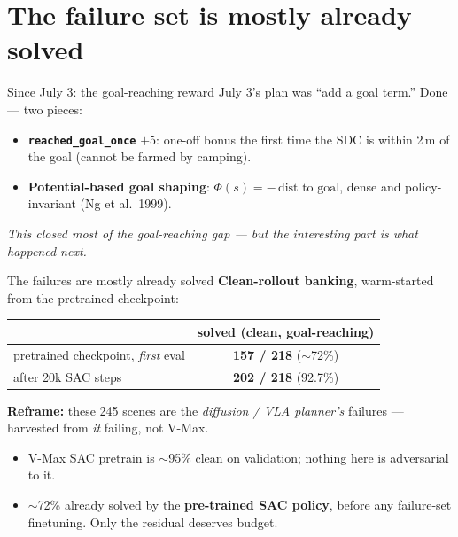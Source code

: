 
\section{The failure set is mostly already solved}

\begin{frame}{Since July 3: the goal-reaching reward}
  July 3's plan was ``add a goal term.'' Done --- two pieces:
  \begin{itemize}
    \item \textbf{\texttt{reached\_goal\_once}} $+5$: one-off bonus the first time the SDC is within 2\,m of the goal (cannot be farmed by camping).
    \item \textbf{Potential-based goal shaping}: $\Phi(s) = -\,\text{dist to goal}$, dense and policy-invariant (Ng et al.\ 1999).
  \end{itemize}

  \vspace{0.6em}
  \centering
  \textit{This closed most of the goal-reaching gap --- but the interesting part is what happened next.}
\end{frame}

\begin{frame}{The failures are mostly already solved}
  \textbf{Clean-rollout banking}, warm-started from the pretrained checkpoint:
  \begin{center}
    \begin{tabular}{@{}lc@{}}
      \toprule
      & solved (clean, goal-reaching) \\
      \midrule
      pretrained checkpoint, \emph{first} eval & \textbf{157 / 218} ($\sim$72\%) \\
      after 20k SAC steps & \textbf{202 / 218} (92.7\%) \\
      \bottomrule
    \end{tabular}
  \end{center}

  \vspace{0.5em}
  \textbf{Reframe:} these 245 scenes are the \emph{diffusion / VLA planner's} failures ---
  harvested from \emph{it} failing, not V-Max.
  \begin{itemize}
    \item V-Max SAC pretrain is $\sim$95\% clean on validation; nothing here is adversarial to it.
    \item $\sim$72\% already solved by the \textbf{pre-trained SAC policy}, before any failure-set finetuning. Only the residual deserves budget.
  \end{itemize}
\end{frame}

